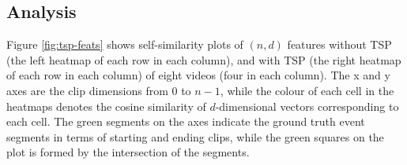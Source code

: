 \subsection{Analysis}
\par Figure \ref{fig:tsp-feats} shows self-similarity plots of $(n, d)$ features without TSP (the left heatmap of each row in each column), and with TSP (the right heatmap of each row in each column) of eight videos (four in each column). The x and y axes are the clip dimensions from $0$ to $n-1$, while the colour of each cell in the heatmaps denotes the cosine similarity of $d$-dimensional vectors corresponding to each cell. The green segments on the axes indicate the ground truth event segments in terms of starting and ending clips, while the green squares on the plot is formed by the intersection of the segments.

